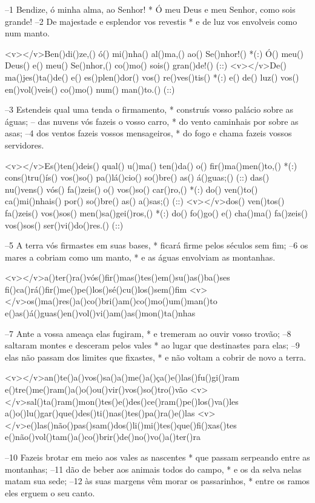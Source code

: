 –1 Bendize, ó minha alma, ao Senhor! *
Ó meu Deus e meu Senhor, como sois grande!
–2 De majestade e esplendor vos revestis *
e de luz vos envolveis como num manto.

<v></v>Ben()di()ze,() ó() mi()nha() al()ma,() ao() Se()nhor!() *(:)
Ó() meu() Deus() e() meu() Se()nhor,() co()mo() sois() gran()de!() (::)
<v></v>De() ma()jes()ta()de() e() es()plen()dor() vos() re()ves()tis() *(:)
e() de() luz() vos() en()vol()veis() co()mo() num() man()to.() (::)

–3 Estendeis qual uma tenda o firmamento, *
construís vosso palácio sobre as águas;
– das nuvens vós fazeis o vosso carro, *
do vento caminhais por sobre as asas;
–4 dos ventos fazeis vossos mensageiros, *
do fogo e chama fazeis vossos servidores.

<v></v>Es()ten()deis() qual() u()ma() ten()da() o() fir()ma()men()to,() *(:)
cons()tru()ís() vos()so() pa()lá()cio() so()bre() as() á()guas;() (::)
das() nu()vens() vós() fa()zeis() o() vos()so() car()ro,() *(:)
do() ven()to() ca()mi()nhais() por() so()bre() as() a()sas;() (::)
<v></v>dos() ven()tos() fa()zeis() vos()sos() men()sa()gei()ros,() *(:)
do() fo()go() e() cha()ma() fa()zeis() vos()sos() ser()vi()do()res.() (::)

–5 A terra vós firmastes em suas bases, *
ficará firme pelos séculos sem fim;
–6 os mares a cobriam como um manto, *
e as águas envolviam as montanhas.

<v></v>a()ter()ra()vós()fir()mas()tes()em()su()as()ba()ses
fi()ca()rá()fir()me()pe()los()sé()cu()los()sem()fim
<v></v>os()ma()res()a()co()bri()am()co()mo()um()man()to
e()as()á()guas()en()vol()vi()am()as()mon()ta()nhas

–7 Ante a vossa ameaça elas fugiram, *
e tremeram ao ouvir vosso trovão;
–8 saltaram montes e desceram pelos vales *
ao lugar que destinastes para elas;
–9 elas não passam dos limites que fixastes, *
e não voltam a cobrir de novo a terra.

<v></v>an()te()a()vos()sa()a()me()a()ça()e()las()fu()gi()ram
e()tre()me()ram()a()o()ou()vir()vos()so()tro()vão
<v></v>sal()ta()ram()mon()tes()e()des()ce()ram()pe()los()va()les
a()o()lu()gar()que()des()ti()nas()tes()pa()ra()e()las
<v></v>e()las()não()pas()sam()dos()li()mi()tes()que()fi()xas()tes
e()não()vol()tam()a()co()brir()de()no()vo()a()ter()ra

–10 Fazeis brotar em meio aos vales as nascentes *
que passam serpeando entre as montanhas;
–11 dão de beber aos animais todos do campo, *
e os da selva nelas matam sua sede;
–12 às suas margens vêm morar os passarinhos, *
entre os ramos eles erguem o seu canto.


